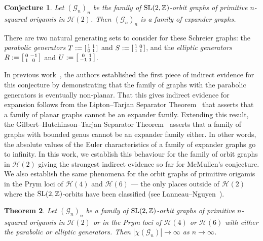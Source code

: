 \documentclass[a4paper,11pt]{amsart}
\numberwithin{equation}{section}
\numberwithin{figure}{section}
\numberwithin{table}{section}
\newtheorem{theorem}{Theorem}[section]
\newtheorem{conjecture}[theorem]{Conjecture}
\newcommand{\calH}{\mathcal{H}}
\newcommand{\Z}{\mathbb{Z}}
\DeclareMathOperator{\SL}{{\rm{SL}}}
\begin{document}
\begin{conjecture}
    Let $(\mathcal{G}_{n})_{n}$ be the family of $\SL(2,\Z)$-orbit graphs of primitive $n$-squared origamis in $\calH(2)$. Then $(\mathcal{G}_{n})_{n}$ is a family of expander graphs.
\end{conjecture}

There are two natural generating sets to consider for these Schreier graphs: the \textit{parabolic generators} $T:=\begin{bsmallmatrix}
    1 & 1 \\
    0 & 1
\end{bsmallmatrix}$ and $S:=\begin{bsmallmatrix}
    1 & 0 \\
    1 & 1
\end{bsmallmatrix}$, and the \textit{elliptic generators} $R:=\begin{bsmallmatrix}
    0 & -1 \\
    1 & 0
\end{bsmallmatrix}$ and $U:=\begin{bsmallmatrix}
    0 & 1 \\
    -1 & 1
\end{bsmallmatrix}$.

In previous work~\cite{JM}, the authors established the first piece of indirect evidence for this conjecture by demonstrating that the family of graphs with the parabolic generators is eventually non-planar. That this gives indirect evidence for expansion follows from the Lipton--Tarjan Separator Theorem~\cite{LT} that asserts that a family of planar graphs cannot be an expander family. Extending this result, the Gilbert--Hutchinson--Tarjan Separator Theorem~\cite{GHT} asserts that a family of graphs with bounded genus cannot be an expander family either. In other words, the absolute values of the Euler characteristics of a family of expander graphs go to infinity. In this work, we establish this behaviour for the family of orbit graphs in $\calH(2)$ giving the strongest indirect evidence so far for McMullen's conjecture. We also establish the same phenomena for the orbit graphs of primitive origamis in the Prym loci of $\calH(4)$ and $\calH(6)$ --- the only places outside of $\calH(2)$ where the $\SL(2,\Z)$-orbits have been classified (see Lanneau--Nguyen~\cite{LN14,LN20}).

\begin{theorem}\label{thm:main}
    Let $(\mathcal{G}_{n})_{n}$ be a family of $\SL(2,\Z)$-orbit graphs of primitive $n$-squared origamis in $\calH(2)$ or in the Prym loci of $\calH(4)$ or $\calH(6)$ with either the parabolic or elliptic generators. Then $|\chi(\mathcal{G}_{n})|\to\infty$ as $n\to\infty$.
\end{theorem}
\end{document}
